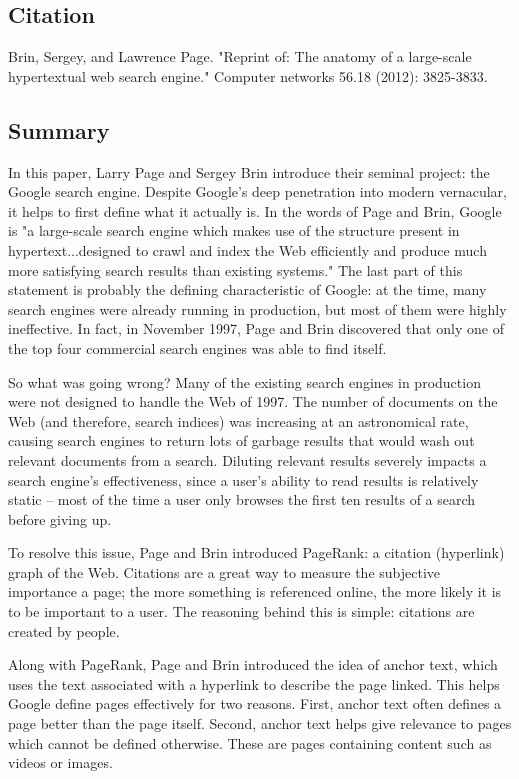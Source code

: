 \documentclass[../summaries.tex]{subfiles}
\begin{document}
\subsection{Citation}
Brin, Sergey, and Lawrence Page. "Reprint of: The anatomy of a large-scale hypertextual web search engine." Computer networks 56.18 (2012): 3825-3833.

\subsection{Summary}
In this paper, Larry Page and Sergey Brin introduce their seminal project:  the Google search engine. Despite Google's deep penetration into modern vernacular, it helps to first define what it actually is. In the words of Page and Brin, Google is "a large-scale search engine which makes use of the structure present in hypertext...designed to crawl and index the Web efficiently and produce much more satisfying search results than existing systems." The last part of this statement is probably the defining characteristic of Google:  at the time, many search engines were already running in production, but most of them were highly ineffective. In fact, in November 1997, Page and Brin discovered that only one of the top four commercial search engines was able to find itself.

So what was going wrong? Many of the existing search engines in production were not designed to handle the Web of 1997. The number of documents on the Web (and therefore, search indices) was increasing at an astronomical rate, causing search engines to return lots of garbage results that would wash out relevant documents from a search. Diluting relevant results severely impacts a search engine's effectiveness, since a user's ability to read results is relatively static -- most of the time a user only browses the first ten results of a search before giving up.

To resolve this issue, Page and Brin introduced PageRank: a citation (hyperlink) graph of the Web. Citations are a great way to measure the subjective importance a page; the more something is referenced online, the more likely it is to be important to a user. The reasoning behind this is simple: citations are created by people.

Along with PageRank, Page and Brin introduced the idea of anchor text, which uses the text associated with a hyperlink to describe the page linked. This helps Google define pages effectively for two reasons. First, anchor text often defines a page better than the page itself. Second, anchor text helps give relevance to pages which cannot be defined otherwise. These are pages containing content such as videos or images.
	
\end{document}
